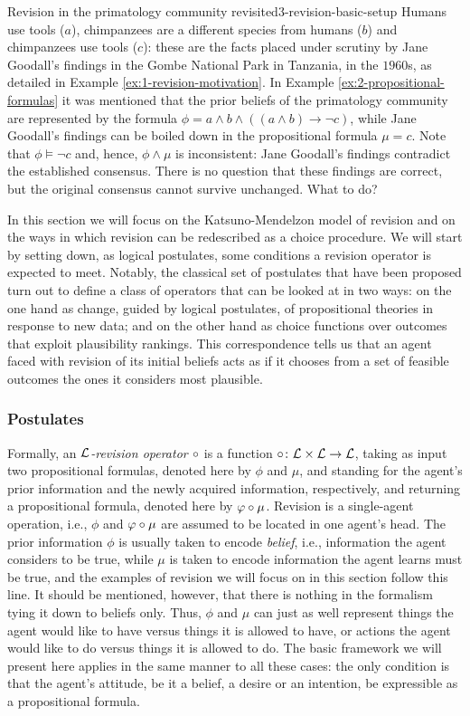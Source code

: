 \begin{xmpl}{Revision in the primatology community revisited}{3-revision-basic-setup}
	Humans use tools ($a$), 
	chimpanzees are a different species from humans ($b$) 
	and 
	chimpanzees use tools ($c$):
	these are the facts placed under scrutiny by Jane Goodall's findings 
	in the Gombe National Park in Tanzania, in the $1960$s, as detailed in 
	Example \ref{ex:1-revision-motivation}.
	In Example \ref{ex:2-propositional-formulas} it was mentioned that
	the prior beliefs of the primatology community are represented
	by the formula $\phi=a\land b\land ((a\land b)\rightarrow\lnot c)$,
	while Jane Goodall's findings can be boiled down in the propositional formula $\mu=c$.
	Note that $\phi\models\lnot c$ and, hence, $\phi\land\mu$ is inconsistent:
	Jane Goodall's findings contradict the established consensus.
	There is no question that these findings are correct, but the original consensus
	cannot survive unchanged. What to do?
\end{xmpl}

In this section we will focus on the Katsuno-Mendelzon model of revision \cite{KatsunoM92}
and on the ways in which revision can be redescribed as a choice procedure.
We will start by setting down, as logical postulates, 
some conditions a revision operator is expected to meet.
Notably, the classical  set of postulates that have been proposed 
turn out to define a class of operators
that can be looked at in two ways:
on the one hand as change, guided by logical postulates,
of propositional theories in response to new data;
and on the other hand
as choice functions over outcomes that exploit plausibility rankings.
This correspondence tells us that an agent faced with revision of its initial beliefs
acts as if it chooses from a set of feasible outcomes
the ones it considers most plausible.

\subsubsection{Postulates}
Formally, an \emph{$\mathcal{L}$-revision operator $\circ$} is a function
$\circ\colon\mathcal{L}\times\mathcal{L}\rightarrow\mathcal{L}$,
taking as input two propositional formulas,
denoted here by $\phi$ and $\mu$,
and standing for the agent's prior information and the newly acquired 
information, respectively,
and returning a propositional formula,
denoted here by $\varphi\circ\mu$.
Revision is a single-agent operation,
i.e., $\phi$ and $\varphi\circ\mu$ are assumed to be located 
in one agent's head.
The prior information $\phi$ is usually taken to encode
\emph{belief}, i.e., information the agent considers to be true,
while $\mu$ is taken to encode information the agent learns 
must be true,
and the examples of revision we will focus on in this section
follow this line.
It should be mentioned, however, that there is nothing in the formalism
tying it down to beliefs only.
Thus, $\phi$ and $\mu$ can just as well represent things 
the agent would like to have versus things it is allowed to have,
or actions the agent would like to do versus things it is 
allowed to do.
The basic framework we will present here applies in the same manner
to all these cases:
the only condition is that the agent's attitude, 
be it a belief, a desire or an intention, be expressible
as a propositional formula.

